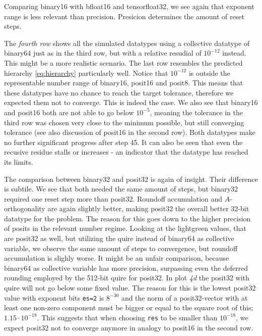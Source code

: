 \documentclass{article}
\theoremstyle{plain} %
\theoremstyle{remark} %
\def\code#1{\texttt{#1}}
\numberwithin{equation}{section}
\begin{document}
Comparing \gls{binary16} with \gls{bfloat16} and \gls{tensorfloat32}, we see again that exponent range is less relevant than precision. Presicion determines the amount of reset steps.

The \textit{fourth row} shows all the simulated datatypes using a collective datatype of \gls{binary64} just as in the third row, but with a relative resudial of $10^{-12}$ instead. This might be a more realistic scenario. The last row resembles the predicted hierarchy \eqref{eq:hierarchy} particularly well. Notice that $10^{-12}$ is outside the representable number range of \gls{binary16}, \gls{posit16} and \gls{posit8}. This means that these datatypes have no chance to reach the target tolerance, therefore we expected them not to converge. This is indeed the case. We also see that \gls{binary16} and \gls{posit16} both are not able to go below $10^{-5}$, meaning the tolerance in the third row was chosen very close to the minimum possible, but still converging tolerance (see also discussion of \gls{posit16} in the second row). Both datatypes make no further significant progress after step \num{45}. It can also be seen that even the recusive residue stalls or increases - an indicator that the datatype has reached its limits.

The comparison between \gls{binary32} and \gls{posit32} is again of insight. Their difference is subtile. We see that both needed the same amount of steps, but \gls{binary32} required one reset step more than \gls{posit32}. Roundoff accumulation and $A$-orthogonality are again slightly better, making \gls{posit32} the overall better \num{32}-bit datatype for the problem. The reason for this goes down to the higher precision of posits in the relevant number regime. Looking at the \textcolor{clightgreen}{lightgreen} values, that are \gls{posit32} as well, but utilizing the \gls{quire} instead of \gls{binary64} as collective variable, we observe the same amount of steps to convergence, but roundoff accumulation is slighly worse. It might be an unfair comparison, because \gls{binary64} as collective variable has more precision, surpassing even the deferred rounding employed by the \num{512}-bit \gls{quire} for \gls{posit32}. In plot \textit{4d} the \gls{posit32} with \gls{quire} will not go below some fixed value. The reason for this is the lowest \gls{posit32} value with exponent bits \code{es=2} is $8^{-30}$ and the norm of a \gls{posit32}-vector with at least one non-zero component must be bigger or equal to the square root of this; $1.15 \cdot 10^{-18}$. This suggests that when choosing \code{res} to be smaller than $10^{-18}$, we expect \gls{posit32} not to converge anymore in analogy to \gls{posit16} in the second row.
\end{document}
